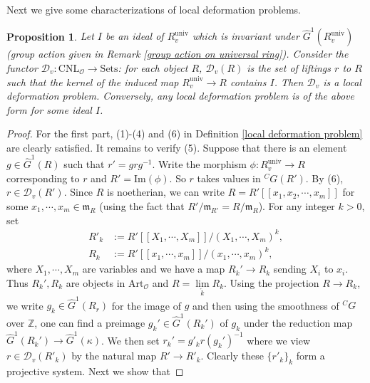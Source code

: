 \documentclass[12pt,oneside,reqno]{amsart}
\theoremstyle{plain}
\newtheorem{proposition}[theorem]{Proposition}
\begin{document}
	Next we give some characterizations of
	local deformation problems.
	\begin{proposition}\label{characterization of local deformation problem}
		Let $I$ be an ideal of
		$R^\mathrm{univ}_v$
		which is invariant under
		$\widehat{G}^1(R^\mathrm{univ}_v)$
		(group action given in
		Remark \ref{group action on universal ring}).
		Consider the functor
		$\mathcal{D}_v
		\colon
		\mathrm{CNL}_\mathcal{O}
		\rightarrow
		\mathrm{Sets}$:
		for each object
		$R$,
		$\mathcal{D}_v(R)$
		is the set of liftings
		$r$ to $R$
		such that the kernel of the induced map
		$R^\mathrm{univ}_v
		\rightarrow
		R$
		contains $I$.
		Then $\mathcal{D}_v$
		is a local deformation problem.
		Conversely,
		any local deformation problem
		is of the above form for some
		ideal $I$.
	\end{proposition}
	\begin{proof}
		For the first part, (1)-(4) and (6) in 
		Definition \ref{local deformation problem}
		are clearly satisfied. It remains to verify (5).
		Suppose that there is an element
		$g\in
		\widehat{G}^1(R)$
		such that
		$r'=grg^{-1}$.
		Write
		the morphism
		$\phi
		\colon
		R^\mathrm{univ}_v
		\rightarrow
		R$
		corresponding to $r$
		and
		$R'=\mathrm{Im}(\phi)$.
		So $r$ takes values in
		$^CG(R')$.
		By (6),
		$r\in\mathcal{D}_v(R')$.
		Since $R$ is noetherian,
		we can write
		$R=R'[[x_1,x_2,\cdots,x_m]]$
		for some
		$x_1,\cdots,x_m\in\mathfrak{m}_R$
		(using the fact that
		$R'/\mathfrak{m}_{R'}=R/\mathfrak{m}_R$).
		For any integer
		$k>0$,
		set
		\begin{align*}
			R'_k&
			:=R'[[X_1,\cdots,X_m]]/(X_1,\cdots,X_m)^k,
			\\
			R_k&
			:=R'[[x_1,\cdots,x_m]]/(x_1,\cdots,x_m)^k,
		\end{align*}
		where
		$X_1,\cdots,X_m$
		are variables
		and we have a map
		$R_k'\rightarrow
		R_k$
		sending $X_i$ to 
		$x_i$.
		Thus
		$R_k',R_k$ are objects in
		$\mathrm{Art}_\mathcal{O}$
		and
		$R=\lim\limits_{\overleftarrow{k}}R_k$.
		Using the projection
		$R\rightarrow R_k$,
		we write
		$g_k\in
		\widehat{G}^1(R_r)$
		for the image of $g$
		and then using the smoothness of
		$^CG$ over $\mathbb{Z}$,
		one can find a preimage
		$g_k'\in
		\widehat{G}^1(R_k')$
		of $g_k$ under the reduction map
		$\widehat{G}^1(R_k')\to\widehat{G}^1(\kappa)$.
		We then set
		$r_k'=g'_kr(g_k')^{-1}$
		where
		we view $r\in\mathcal{D}_v(R'_k)$
		by the natural map
		$R'\rightarrow R'_k$.
		Clearly these
		$\{r'_k\}_k$
		form a projective system.
		Next we show that

\end{proof}
\end{document}
